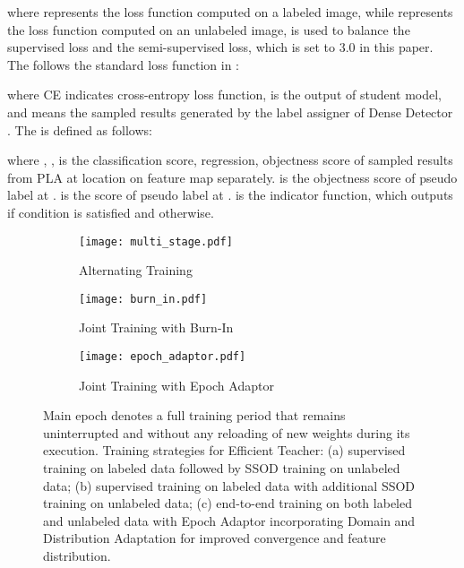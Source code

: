 \documentclass[10pt,twocolumn,letterpaper]{article}
\begin{document}
\noindent
where  represents the loss function computed on a labeled image, while  represents the loss function computed on an unlabeled image,   is used to balance the supervised loss and the semi-supervised loss, which is set to 3.0 in this paper. The  follows the standard loss function in \cite{jocher2022ultralytics}:

where CE indicates cross-entropy loss function,  is the output of student model, and  means the sampled results generated by the label assigner of Dense Detector . The  is defined as follows: 




\begin{small}

\end{small}




\noindent
where , ,  is the classification score, regression, objectness score of sampled results from PLA at location  on feature map separately.  is the objectness score of pseudo label at  .  is the score of pseudo label at  .  is the indicator function, which outputs  if condition  is satisfied and  otherwise. 




\begin{figure*}[h]
    \centering \begin{subfigure}[b]{0.3\textwidth}
        \centering
        \label{Fig.sub.1}
\texttt{[image: multi\_stage.pdf]}

        \caption{Alternating Training}
    \end{subfigure}
\begin{subfigure}[b]{0.3\textwidth}
        \centering
        \label{Fig.sub.2}
        \texttt{[image: burn\_in.pdf]}
        \caption{Joint Training with Burn-In}
    \end{subfigure}
    \begin{subfigure}[b]{0.3\textwidth}
    \centering
    \label{Fig.sub.3}
    \texttt{[image: epoch\_adaptor.pdf]}
\caption{Joint Training with Epoch Adaptor}
    \end{subfigure}
\caption{Main epoch denotes a full training period that remains uninterrupted and without any reloading of new weights during its execution. Training strategies for Efficient Teacher: (a) supervised training on labeled data followed by SSOD training on unlabeled data; (b) supervised training on labeled data with additional SSOD training on unlabeled data; (c) end-to-end training on both labeled and unlabeled data with Epoch Adaptor incorporating Domain and Distribution Adaptation for improved convergence and feature distribution.}
\label{fig:epoch_adaptor_compare}
\end{figure*}
\end{document}
